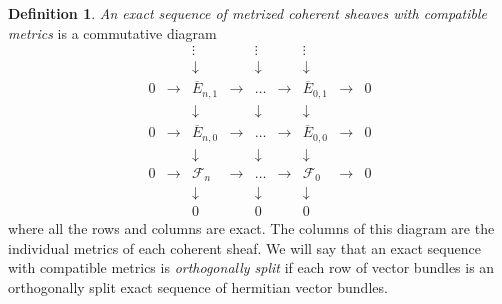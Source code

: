 \documentclass[10pt,twoside]{article}
\numberwithin{equation}{section}
\theoremstyle{plain}
\theoremstyle{definition}
\newtheorem{definition}[equation]{Definition}
\begin{document}
\begin{definition}
  \emph{An exact sequence of metrized coherent sheaves with compatible
    metrics}  
  is a commutative diagram 
  \begin{equation}
    \label{eq:100}
    \begin{array}{ccccccccc}
      && \vdots && \vdots && \vdots && \\
      && \downarrow && \downarrow && \downarrow && \\
      0 & \rightarrow & \overline{E}_{n,1} & \rightarrow &
      \ldots & \rightarrow &
      \overline{E}_{0,1} & \rightarrow & 0\\
      && \downarrow && \downarrow && \downarrow && \\
      0 & \rightarrow & \overline{E}_{n,0} & \rightarrow &
      \ldots & \rightarrow &
      \overline{E}_{0,0} & \rightarrow & 0 \\
      && \downarrow && \downarrow && \downarrow && \\
      0 & \rightarrow & \mathcal{F}_{n} & \rightarrow &
      \ldots & \rightarrow &
      \mathcal{F}_{0} & \rightarrow & 0 \\
      && \downarrow && \downarrow && \downarrow && \\
      && 0 && 0 && 0 &&
    \end{array}  
  \end{equation}
  where all the rows and columns are exact. The columns of this
  diagram are the individual metrics of each coherent sheaf. We will
  say that an exact sequence with compatible metrics is
  \emph{orthogonally split} if each row of vector bundles is an
  orthogonally split exact 
  sequence of hermitian vector bundles.
\end{definition}
\end{document}
